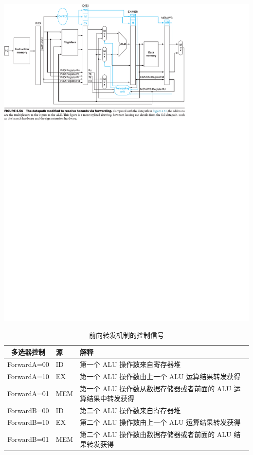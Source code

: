 \documentclass[a4paper,UTF8]{ctexart}
\begin{document}
\includegraphics[width=\textwidth]{forwarding.pdf}

\begin{table}[h]
    \centering
    \caption{前向转发机制的控制信号}\label{tab:fwd}
    \begin{tabular}{>{\ttfamily}c>{\ttfamily}ll}
        \toprule
        多选器控制 & 源 & 解释 \\
        \midrule
        ForwardA=00 & ID & 第一个 ALU 操作数来自寄存器堆 \\
        ForwardA=10 & EX & 第一个 ALU 操作数由上一个 ALU 运算结果转发获得 \\
        ForwardA=01 & MEM & 第一个 ALU 操作数从数据存储器或者前面的 ALU 运算结果中转发获得 \\
        ForwardB=00 & ID & 第二个 ALU 操作数来自寄存器堆 \\
        ForwardB=10 & EX & 第二个 ALU 操作数由上一个 ALU 运算结果转发获得 \\
        ForwardB=01 & MEM & 第二个 ALU 操作数由数据存储器或者前面的 ALU 结果转发获得 \\
        \bottomrule
    \end{tabular}
\end{table}
\end{document}
